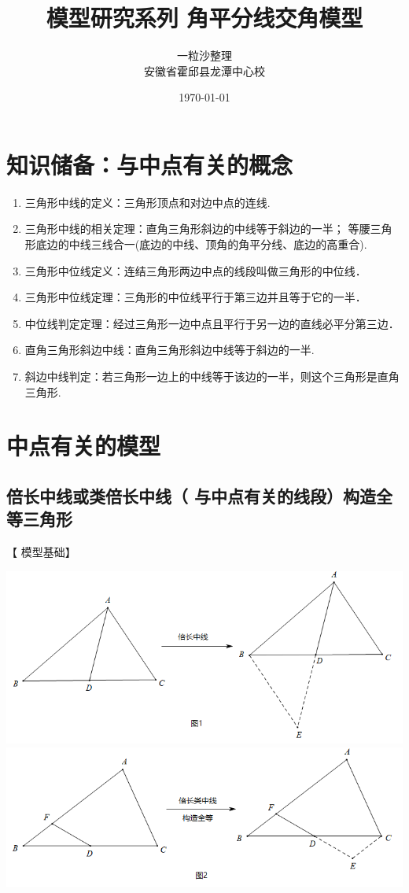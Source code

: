 \documentclass[10pt]{ctexart}
\title{模型研究系列 \quad 角平分线交角模型}
\author{一粒沙整理\\安徽省霍邱县龙潭中心校}
\date{\today}
\begin{document}
\maketitle
\tableofcontents


\section{知识储备：与中点有关的概念}
{\kaishu\color{blue}
\begin{enumerate}
	\item {\heiti\color{cyan}三角形中线的定义}：三角形顶点和对边中点的连线.
	\item {\heiti\color{cyan}三角形中线的相关定理}：直角三角形斜边的中线等于斜边的一半；
等腰三角形底边的中线三线合一(底边的中线、顶角的角平分线、底边的高重合).
	\item {\heiti\color{cyan}三角形中位线定义}：连结三角形两边中点的线段叫做三角形的中位线．
	\item {\heiti\color{cyan}三角形中位线定理}：三角形的中位线平行于第三边并且等于它的一半．
	\item {\heiti\color{cyan}中位线判定定理}：经过三角形一边中点且平行于另一边的直线必平分第三边．
	\item {\heiti\color{cyan}直角三角形斜边中线}：直角三角形斜边中线等于斜边的一半.
	\item {\heiti\color{cyan}斜边中线判定}：若三角形一边上的中线等于该边的一半，则这个三角形是直角三角形.
\end{enumerate}
}

\section{中点有关的模型}
\subsection{倍长中线或类倍长中线（ 与中点有关的线段）构造全等三角形}
【 {\heiti 模型基础}】

\begin{center}
	\includegraphics[scale=0.6]{figure/zhongdian01}\\
	\includegraphics[scale=0.6]{figure/zhongdian02}
\end{center}
\end{document}
